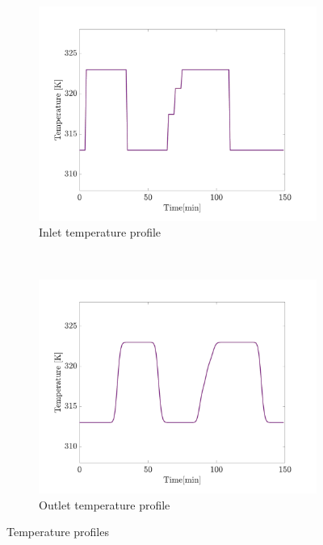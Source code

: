 \documentclass[]{scrartcl}
\begin{document}
\begin{figure}[!h]
	\centering
	\begin{subfigure}[h]{0.5\textwidth}
		\centering
		\includegraphics[width=\textwidth,trim = 0cm 0cm 0cm 0cm, clip]{Best_T_in_P250.pdf}
		\caption{Inlet temperature profile}
		\label{fig:Best_T_in_P250}
	\end{subfigure}%
	~ 
	\begin{subfigure}[h]{0.5\textwidth}
		\centering
		\includegraphics[width=\textwidth,trim = 0cm 0cm 0cm 0cm, clip]{Best_T_out_P250.pdf}
		\caption{Outlet temperature profile}
		\label{fig:Best_T_out_P250}
	\end{subfigure}
	\caption{Temperature profiles}
	\label{fig:DOE_results}
\end{figure}
\end{document}
